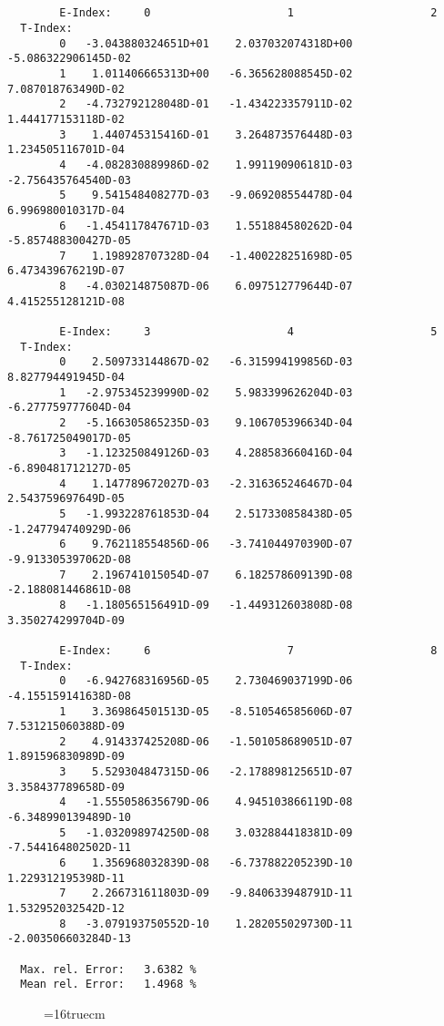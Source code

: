 \documentclass[12pt,dvipdfmx]{article}
\begin{document}
\begin{small}\begin{verbatim}


        E-Index:     0                     1                     2
  T-Index:
        0   -3.043880324651D+01    2.037032074318D+00   -5.086322906145D-02
        1    1.011406665313D+00   -6.365628088545D-02    7.087018763490D-02
        2   -4.732792128048D-01   -1.434223357911D-02    1.444177153118D-02
        3    1.440745315416D-01    3.264873576448D-03    1.234505116701D-04
        4   -4.082830889986D-02    1.991190906181D-03   -2.756435764540D-03
        5    9.541548408277D-03   -9.069208554478D-04    6.996980010317D-04
        6   -1.454117847671D-03    1.551884580262D-04   -5.857488300427D-05
        7    1.198928707328D-04   -1.400228251698D-05    6.473439676219D-07
        8   -4.030214875087D-06    6.097512779644D-07    4.415255128121D-08

        E-Index:     3                     4                     5
  T-Index:
        0    2.509733144867D-02   -6.315994199856D-03    8.827794491945D-04
        1   -2.975345239990D-02    5.983399626204D-03   -6.277759777604D-04
        2   -5.166305865235D-03    9.106705396634D-04   -8.761725049017D-05
        3   -1.123250849126D-03    4.288583660416D-04   -6.890481712127D-05
        4    1.147789672027D-03   -2.316365246467D-04    2.543759697649D-05
        5   -1.993228761853D-04    2.517330858438D-05   -1.247794740929D-06
        6    9.762118554856D-06   -3.741044970390D-07   -9.913305397062D-08
        7    2.196741015054D-07    6.182578609139D-08   -2.188081446861D-08
        8   -1.180565156491D-09   -1.449312603808D-08    3.350274299704D-09

        E-Index:     6                     7                     8
  T-Index:
        0   -6.942768316956D-05    2.730469037199D-06   -4.155159141638D-08
        1    3.369864501513D-05   -8.510546585606D-07    7.531215060388D-09
        2    4.914337425208D-06   -1.501058689051D-07    1.891596830989D-09
        3    5.529304847315D-06   -2.178898125651D-07    3.358437789658D-09
        4   -1.555058635679D-06    4.945103866119D-08   -6.348990139489D-10
        5   -1.032098974250D-08    3.032884418381D-09   -7.544164802502D-11
        6    1.356968032839D-08   -6.737882205239D-10    1.229312195398D-11
        7    2.266731611803D-09   -9.840633948791D-11    1.532952032542D-12
        8   -3.079193750552D-10    1.282055029730D-11   -2.003506603284D-13

  Max. rel. Error:   3.6382 %
  Mean rel. Error:   1.4968 %

\end{verbatim}\end{small}
\begin{figure} \label{7.2d}
\epsfxsize=16truecm
\end{figure}
\newpage
\end{document}
